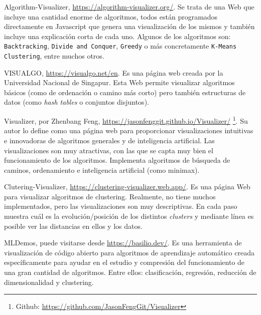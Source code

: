 Algorithm-Visualizer, \url{https://algorithm-visualizer.org/}. Se trata de una
Web que incluye una cantidad enorme de algoritmos, todos están programados
directamente en Javascript que genera una visualización de los mismos y también
incluye una explicación corta de cada uno. Algunos de los algoritmos son:
\texttt{Backtracking}, \texttt{Divide and Conquer}, \texttt{Greedy} o más
concretamente \texttt{K-Means Clustering}, entre muchos otros.


VISUALGO, \url{https://visualgo.net/en}. Es una página web creada por la
Universidad Nacional de Singapur. Esta Web permite visualizar algoritmos básicos
(como de ordenación o camino más corto) pero también estructuras de datos (como
\emph{hash tables} o conjuntos disjuntos).


Visualizer, por Zhenbang Feng, \url{https://jasonfenggit.github.io/Visualizer/}
\footnote{ Github: \url{https://github.com/JasonFengGit/Visualizer}}. Su autor
lo define como una página web para proporcionar visualizaciones intuitivas e
innovadoras de algoritmos generales y de inteligencia artificial. Las
visualizaciones son muy atractivas, con las que se capta muy bien el
funcionamiento de los algoritmos. Implementa algoritmos de búsqueda de caminos,
ordenamiento e inteligencia artificial (como minimax).



Clutering-Visualizer, \url{https://clustering-visualizer.web.app/}. Es una
página Web para visualizar algoritmos de clustering. Realmente, no tiene muchos
implementados, pero las visualizaciones son muy descriptivas. En cada paso
muestra cuál es la evolución/posición de los distintos \textit{clusters} y mediante línea
es posible ver las distancias en ellos y los datos.



MLDemos, puede visitarse desde \url{https://basilio.dev/}. Es una herramienta de
visualización de código abierto para algoritmos de aprendizaje automático creada
específicamente para ayudar en el estudio y compresión del funcionamiento de una
gran cantidad de algoritmos. Entre ellos: clasificación, regresión, reducción de
dimensionalidad y clustering.

